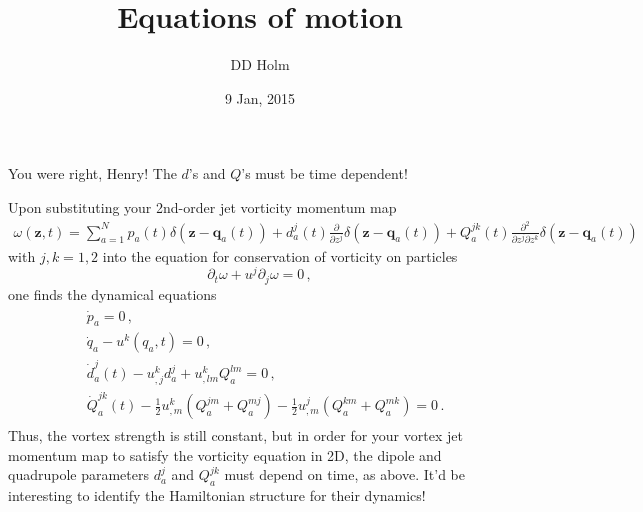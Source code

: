 \documentclass[12pt]{amsart}
\title{Equations of motion}
\author{DD Holm}
\date{9 Jan, 2015}
\begin{document}
\maketitle
You were right, Henry! The $d$’s and $Q$’s must be time dependent!

Upon substituting your 2nd-order jet vorticity momentum map
\begin{align}
\omega(\mathbf{z},t) =
\sum_{a=1}^N{p}_a(t) \delta(\mathbf{z}-\mathbf{q}_a(t))
+ d_a^j(t)  \frac{\partial }{\partial z^j}\delta(\mathbf{z}-\mathbf{q}_a(t))
+ Q_a^{jk}(t)  \frac{\partial^2 }{\partial z^j\partial z^k}\delta(\mathbf{z}-\mathbf{q}_a(t))
\label{Henry’s_vortex_momap}
\end{align}
with $j,k=1,2$ into the equation for conservation of vorticity on particles
\[
\partial_t \omega + u^j\partial_j \omega = 0\,,
\]
one finds the dynamical equations
\begin{align}
\begin{split}
&\dot{p}_a = 0
\,,\\&
\dot{q}_a - u^k(q_a,t) = 0
\,,\\&
\dot{d}_a^j(t) - u^k_{,j}d^j_a + u^k_{,lm}Q^{lm}_a = 0
\,,\\&
\dot{Q}_a^{jk}(t) - \frac12u^k_{,m}(Q^{jm}_a+Q^{mj}_a) - \frac12u^j_{,m}(Q^{km}_a+Q^{mk}_a)  = 0
\,.\end{split}
\label{jet-dyn-eqns}
\end{align}
Thus, the vortex strength is still constant, but in order for your vortex jet momentum map to satisfy the vorticity equation in 2D, the dipole and quadrupole parameters $d^j_a$ and $Q_a^{jk}$ must depend on time, as above. It’d be interesting to identify the Hamiltonian structure for their dynamics!



\end{document}
